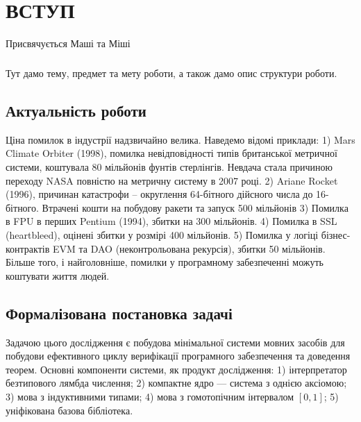 \chapter*{ВСТУП}

\epigraph{Присвячується Маші та Міші}{}

\paragraph{}
Тут дамо тему, предмет та мету роботи, а також дамо опис структури роботи.

\section*{Актуальність роботи}
Ціна помилок в індустрії надзвичайно велика. Наведемо
відомі приклади: 1) Mars Climate Orbiter (1998), помилка невідповідності
типів британської метричної системи, коштувала 80 мільйонів фунтів стерлінгів.
Невдача стала причиною переходу NASA повністю на метричну систему в 2007 році.
2) Ariane Rocket (1996), причинан катастрофи -- округлення 64-бітного дійсного
числа до 16-бітного. Втрачені кошти на побудову ракети та запуск 500 мільйонів
3) Помилка в FPU в перших Pentium (1994), збитки на 300 мільйонів.
4) Помилка в SSL (heartbleed), оцінені збитки у розмірі 400 мільйонів.
5) Помилка у логіці бізнес-контрактів EVM та
DAO (неконтрольована рекурсія), збитки 50 мільйонів.
Більше того, і найголовніше, помилки у програмному забезпеченні можуть
коштувати життя людей.

\section*{Формалізована постановка задачі}
Задачою цього дослідження є побудова мінімальної системи
мовних засобів для побудови ефективного циклу верифікації програмного
забезпечення та доведення теорем. Основні компоненти системи, як продукт
дослідження: 1) інтерпретатор безтипового лямбда числення;
2) компактне ядро --- система з однією аксіомою;
3) мова з індуктивними типами;
4) мова з гомотопічним інтервалом $[0,1]$;
5) уніфікована базова бібліотека.


